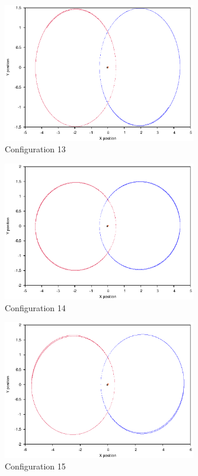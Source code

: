 \documentclass[a4paper,12pt]{article}
\begin{document}
\begin{figure}[H]
\centering
\includegraphics[width=0.75\textwidth]{./results/05-9-05-1/Orbit.eps}
\caption{Configuration 13}
\label{fig:config13}
\end{figure}
\begin{figure}[H]
\centering
\includegraphics[width=0.75\textwidth]{./results/05-9-05-15/Orbit.eps}
\caption{Configuration 14}
\label{fig:config14}
\end{figure}
\begin{figure}[H]
\centering
\includegraphics[width=0.75\textwidth]{./results/06-95-06-15/Orbit.eps}
\caption{Configuration 15}
\label{fig:config15}
\end{figure}
\end{document}
